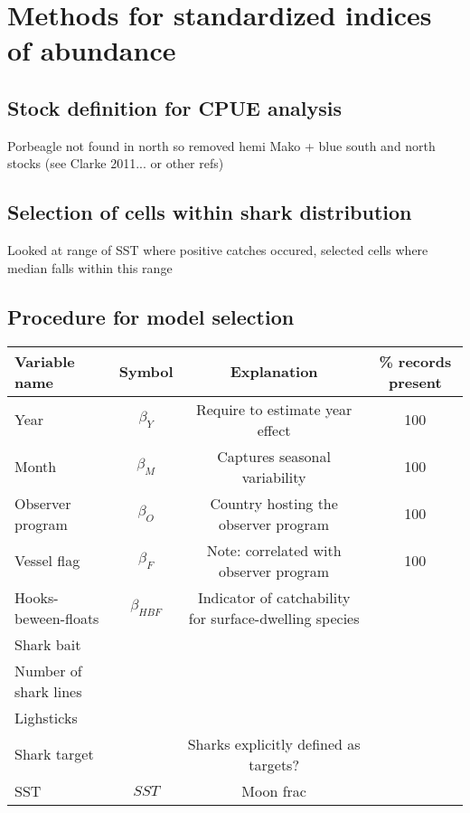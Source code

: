 \documentclass{SCreport}
\begin{document}

\section{Methods for standardized indices of abundance}
\subsection{Stock definition for CPUE analysis}
Porbeagle not found in north so removed hemi
Mako + blue south and north stocks (see Clarke 2011... or other refs)
\subsection{Selection of cells within shark distribution}
Looked at range of SST where positive catches occured, selected cells where median falls within this range 
\subsection{Procedure for model selection}

\begin{table}[!h]
\begin{center}
\begin{tabular}{l|c|c|c}
Variable name & Symbol & Explanation & \% records present\\
\hline
\hline
Year & $\beta_Y$ & Require to estimate year effect & 100\\
Month & $\beta_M$ & Captures seasonal variability & 100\\
Observer program & $\beta_O$ & Country hosting the observer program & 100\\
Vessel flag & $\beta_F$ & Note: correlated with observer program & 100\\
Hooks-beween-floats& $\beta_{HBF}$ & Indicator of catchability for surface-dwelling species\\
Shark bait \\
Number of shark lines\\
Lighsticks \\
Shark target&&Sharks explicitly defined as targets?\\
SST & $SST$ & 
Moon frac & \\

\end{tabular}
\end{center}
\end{table}
\end{document}
